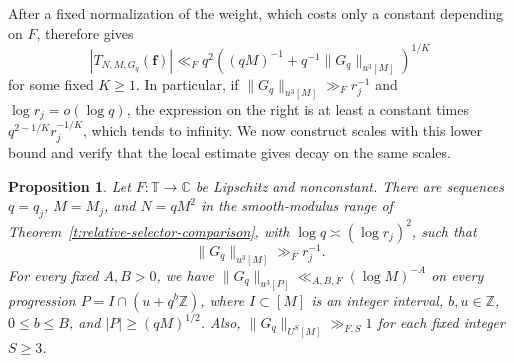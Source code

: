 \documentclass[12pt]{amsart}
\newcommand{\1}{\mathbf 1}
\newtheorem{proposition}[theorem]{Proposition}
\theoremstyle{definition}
\begin{document}
After a fixed normalization of the weight, which costs only
a constant depending on \(F\), \cite[Theorem~4.1]{Teravainen}
therefore gives
\begin{equation}\label{e:lift-teravainen-bound}
 |T_{N,M,G_q}(\mathbf f)|
 \ll_F q^2\left((qM)^{-1}
          +q^{-1}\|G_q\|_{u^3[M]}\right)^{1/K}
\end{equation}
for some fixed \(K\geq1\). In particular, if
\(\|G_q\|_{u^3[M]}\gg_F r_j^{-1}\) and
\(\log r_j=o(\log q)\), the expression on the right is at least
a constant times \(q^{2-1/K}r_j^{-1/K}\), which tends to infinity.
We now construct scales with this lower bound and verify that
the local estimate gives decay on the same scales.

\begin{proposition}\label{p:separating-family}
Let $F:\mathbb T\to\mathbb C$ be Lipschitz and nonconstant.
There are sequences $q=q_j$, $M=M_j$, and $N=qM^2$ in the
smooth-modulus range of Theorem~\ref{t:relative-selector-comparison},
with $\log q\asymp(\log r_j)^2$, such that
\begin{equation}\label{e:separating-global-u}
 \|G_q\|_{u^3[M]}\gg_F r_j^{-1}.
\end{equation}
For every fixed $A,B>0$, we have
$\|G_q\|_{u^3[P]}\ll_{A,B,F}(\log M)^{-A}$ on every progression
$P=I\cap(u+q^b\mathbb Z)$, where $I\subset[M]$ is an integer
interval, $b,u\in\mathbb Z$, $0\leq b\leq B$, and
$|P|\geq(qM)^{1/2}$. Also, $\|G_q\|_{U^S[M]}\gg_{F,S}1$
for each fixed integer $S\geq3$.
\end{proposition}
\end{document}
